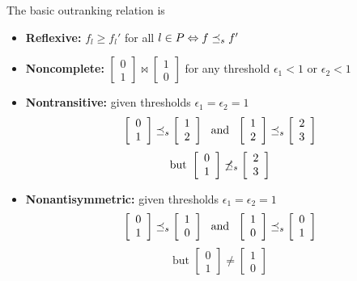 The basic outranking relation is
\begin{itemize}
	\item \textbf{Reflexive:} $f_l \geq f_l'$ for all $l \in P \Leftrightarrow f \preceq_{s} f'$
	
	\item \textbf{Noncomplete:} $\left[\begin{array}{c}
		0 \\ 1
	\end{array}\right] \bowtie \left[\begin{array}{c}
	1 \\ 0 
	\end{array}\right]$ for any threshold $\epsilon_1 < 1$ or $\epsilon_2 < 1$
	
	\item \textbf{Nontransitive:} given thresholds $\epsilon_1 = \epsilon_2 = 1$
	$$ 
	\left[ \begin{array}{c}
		0 \\ 1
	\end{array}\right] \preceq_{s} \left[ \begin{array}{c}
	1 \\ 2
	\end{array}\right] \ \text{ and } \ \left[ \begin{array}{c}
	1 \\ 2
	\end{array}\right] \preceq_{s} \left[ \begin{array}{c}
	2 \\ 3
	\end{array}\right]
	$$
	$$ \text{but } \left[ \begin{array}{c}
		0 \\ 1
	\end{array}\right] \not \preceq_{s} \left[ \begin{array}{c}
	2 \\ 3
	\end{array}\right]$$
	
	\item \textbf{Nonantisymmetric:} given thresholds $\epsilon_1 = \epsilon_2 = 1$
	$$
	\left[ \begin{array}{c}
		0 \\ 1
	\end{array}\right] \preceq_{s} \left[ \begin{array}{c}
	1 \\ 0
	\end{array}\right] \ \text{ and } \ \left[ \begin{array}{c}
	1 \\ 0
	\end{array}\right] \preceq_{s} \left[ \begin{array}{c}
	0 \\ 1
	\end{array}\right]
	$$ 
	$$ \text{but } \left[ \begin{array}{c}
		0 \\ 1
	\end{array}\right] \neq \left[ \begin{array}{c}
	1 \\ 0
	\end{array}\right]$$
\end{itemize}

